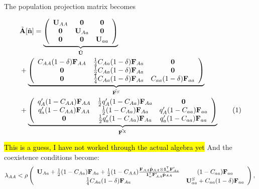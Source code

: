 \documentclass[11pt]{article}
\newcommand\numberthis{\addtocounter{equation}{1}\tag{\theequation}}
\def\mbf#1{\mathbf{#1}}
\newcommand{\tr}{{\mbox{\tiny \sf T}}}
\begin{document}
\begin{landscape}
The population projection matrix becomes

\begin{align*}
	&\tilde{\mbf{A}}[\tilde{\mbf{n}}] = 
		 \underbrace{\left(
			\begin{array}{ccc}
				\mathbf{U}_{AA} & \mbf{0} & \mbf{0}\\ 
				\mbf{0} & \mathbf{U}_{Aa} & \mbf{0} \\
				\mbf{0} & \mbf{0} & \mathbf{U}_{aa} 
			\end{array} \right)}_{\tilde{\mbf{U}}}  \\ 
	&+\underbrace{\left(
			\begin{array}{ccc}
				C_{AA} (1 - \delta) \mbf{F}_{AA} & \frac{1}{4} C_{Aa} (1 - \delta) \mbf{F}_{Aa} & \mbf{0} \\ 
				\mbf{0} & \frac{1}{2} C_{Aa} (1 - \delta) \mbf{F}_{Aa} & \mbf{0} \\
				\mbf{0} & \frac{1}{4} C_{Aa} (1 - \delta) \mbf{F}_{Aa} & C_{aa} (1 - \delta) \mbf{F}_{aa} 
			\end{array} \right)}_{\tilde{\mbf{F}^S}} \\
			&+\underbrace{\left(
			\begin{array}{ccc}
				q^{\prime}_{A} (1 - C_{AA})\mbf{F}_{AA} & \frac{1}{2} q^{\prime}_{A} (1 - C_{Aa})\mbf{F}_{Aa}  & \mbf{0} \\
				q^{\prime}_{a} (1 - C_{AA}) \mbf{F}_{AA} & \frac{1}{2} (1 - C_{Aa})\mbf{F}_{Aa}  & q^{\prime}_{A} (1 - C_{aa})\mbf{F}_{aa}   \\
				\mbf{0} & \frac{1}{2} q^{\prime}_{a} (1 - C_{Aa})\mbf{F}_{Aa} & q^{\prime}_{a} (1 - C_{aa}) \mbf{F}_{aa} 
			\end{array} \right)}_{\tilde{\mbf{F}^X}} \numberthis
\end{align*}

\hl{This is a guess, I have not worked through the actual algebra yet} And the coexistence conditions become:
\begin{equation} \label{eq:coexist_bigAA}
	\lambda_{AA} < 
			\rho\left(\begin{array}{cc}
\mathbf{U}_{Aa} + \frac{1}{2} (1 - C_{Aa}) \mbf{F}_{Aa} +\frac{1}{2} (1 - C_{AA})\frac{\mbf{F}_{AA}\hat{\mbf{p}}_{AA}\otimes \mathbf{1}^\tr_{\omega} \mathbf{F}_{Aa}^\prime}{\mathbf{1}^\tr_\omega \mathbf{F}_{AA}^\prime \hat{\mathbf{p}}_{AA}	} & (1-C_{aa}) \mbf{F}_{aa} \\
\frac{1}{4} C_{Aa} (1 - \delta) \mbf{F}_{Aa}  &\mathbf{U}^S_{aa} +C_{aa} (1 - \delta) \mbf{F}_{aa}  \\ 
			\end{array} \right), \\ 
\end{equation} 


\end{landscape}
\end{document}
